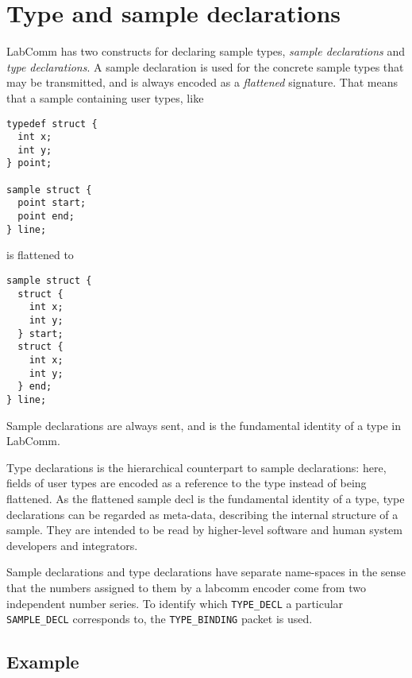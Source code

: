 \documentclass[a4paper]{article}
\begin{document}
\section{Type and sample declarations}

LabComm has two constructs for declaring sample types, \emph{sample
declarations} and \emph{type declarations}. A sample declaration is used
for the concrete sample types that may be transmitted, and is always
encoded as a \emph{flattened} signature. That means that a sample
containing user types, like

\begin{verbatim}
typedef struct {
  int x;
  int y;
} point;

sample struct {
  point start;
  point end;
} line;
\end{verbatim}

is flattened to 

\begin{verbatim}
sample struct {
  struct {
    int x;
    int y;
  } start;
  struct {
    int x;
    int y;
  } end;
} line;
\end{verbatim}

Sample declarations are always sent, and is the fundamental identity of
a type in LabComm. 

Type declarations is the hierarchical counterpart to sample
declarations: here, fields of user types are encoded as a reference to
the type instead of being flattened. As the flattened sample decl is the
fundamental identity of a type, type declarations can be regarded as
meta-data, describing the internal structure of a sample. They are
intended to be read by higher-level software and human system developers
and integrators.

Sample declarations and type declarations have separate name-spaces in
the sense that the numbers assigned to them by a labcomm encoder 
come from two independent number series. To identify which
\verb+TYPE_DECL+ a particular \verb+SAMPLE_DECL+ corresponds to, the
\verb+TYPE_BINDING+ packet is used.

\subsection{Example}
\end{document}
